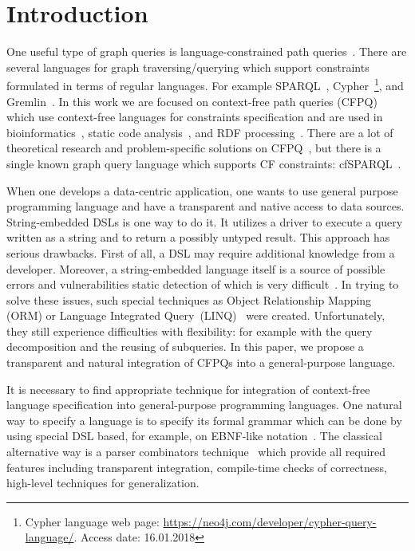 \section{Introduction}

One useful type of graph queries is language-constrained path queries~\cite{FLCpathProblem}.
There are several languages for graph traversing/querying which support constraints formulated in terms of regular languages.
For example SPARQL~\cite{sparql}, Cypher~\footnote{Cypher language web page: \url{https://neo4j.com/developer/cypher-query-language/}. Access date: 16.01.2018}, and Gremlin~\cite{gremlin}.
In this work we are focused on context-free path queries (CFPQ) which use context-free languages for constraints specification and are used in bioinformatics~\cite{GraphQueryWithEarley}, static code analysis~\cite{Reps, Zheng, LabelFlowCFLReachability, specificationCFLReachability, JavaCFL}, and RDF processing~\cite{CFGonRDF}. 
There are a lot of theoretical research and problem-specific solutions on CFPQ~\cite{Yannakakis, ConjCFPathQuery, Hellings16, QueryGraphWithData, RegularDBQuery, GraphQueryWithEarley, graphDB}, but there is a single known graph query language which supports CF constraints: cfSPARQL~\cite{CFGonRDF}.

When one develops a data-centric application, one wants to use general purpose programming language and have a transparent and native access to data sources.
String-embedded DSLs is one way to do it. 
It utilizes a driver to execute a query written as a string and to return a possibly untyped result. 
This approach has serious drawbacks.
First of all, a DSL may require additional knowledge from a developer.
Moreover, a string-embedded language itself is a source of possible errors and vulnerabilities static detection of which is very difficult~\cite{stringEmbeddedLanguagesProblem}.  
In trying to solve these issues, such special techniques as Object Relationship Mapping (ORM) or Language Integrated Query~(LINQ)~\cite{LINQ1, LINQ2, LinqRDF} were created. Unfortunately, they still experience difficulties with flexibility: for example with the query decomposition and the reusing of subqueries.
In this paper, we propose a transparent and natural integration of CFPQs into a general-purpose language. 

It is necessary to find appropriate technique for integration of context-free language specification into general-purpose programming languages.
One natural way to specify a language is to specify its formal grammar which can be done by using special DSL based, for example, on EBNF-like notation~\cite{EBNFISO}.
The classical alternative way is a parser combinators technique~\cite{MonadicPArserCombinators} which provide all required features including transparent integration, compile-time checks of correctness, high-level techniques for generalization.

